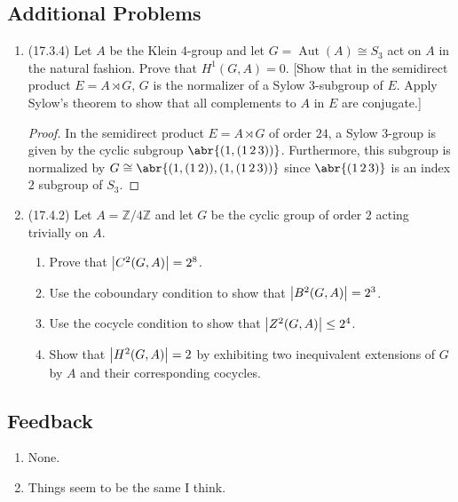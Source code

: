 \documentclass[11pt]{article}
\DeclareMathOperator\Aut{Aut}
\begin{document}
\subsection*{Additional Problems}
\begin{enumerate}
    \item (17.3.4) Let $A$ be the Klein $4$-group and let $G = \Aut(A)\cong S_3$ act on $A$ in the natural fashion. Prove that $H^1(G,A) = 0$. [Show that in the semidirect product $E = A\rtimes G$, $G$ is the normalizer of a Sylow $3$-subgroup of $E$. Apply Sylow's theorem to show that all complements to $A$ in $E$ are conjugate.]\begin{proof}
        In the semidirect product $E = A\rtimes G$ of order $24$, a Sylow $3$-group is given by the cyclic subgroup $\abr{(1,(1\,2\,3))}$. Furthermore, this subgroup is normalized by $G\cong \abr{(1,(1\,2)),(1,(1\,2\,3))}$ since $\abr{(1\,2\,3)}$ is an index $2$ subgroup of $S_3$. 
    \end{proof}
    \item (17.4.2) Let $A=\mathbb{Z}/4\mathbb{Z}$ and let $G$ be the cyclic group of order $2$ acting trivially on $A$.\begin{enumerate}
        \item Prove that $\abs{C^2(G,A)} = 2^8$.
        \item Use the coboundary condition to show that $\abs{B^2(G,A)} = 2^3$.
        \item Use the cocycle condition to show that $\abs{Z^2(G,A)} \leq 2^4$. 
        \item Show that $\abs{H^2(G,A)} = 2$ by exhibiting two inequivalent extensions of $G$ by $A$ and their corresponding cocycles.
    \end{enumerate}
\end{enumerate}
\subsection*{Feedback}
\begin{enumerate}
    \item None.
    \item Things seem to be the same I think.
\end{enumerate}
\end{document}
